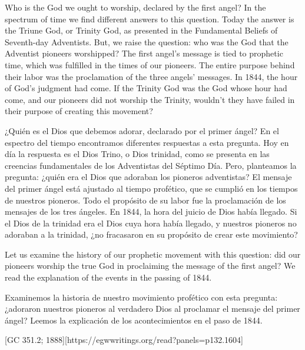 Who is the God we ought to worship, declared by the first angel? In the spectrum of time we find different answers to this question. Today the answer is the Triune God, or Trinity God, as presented in the Fundamental Beliefs of Seventh-day Adventists. But, we raise the question: who was the God that the Adventist pioneers worshipped? The first angel’s message is tied to prophetic time, which was fulfilled in the times of our pioneers. The entire purpose behind their labor was the proclamation of the three angels’ messages. In 1844, the hour of God’s judgment had come. If the Trinity God was the God whose hour had come, and our pioneers did not worship the Trinity, wouldn't they have failed in their purpose of creating this movement?


¿Quién es el Dios que debemos adorar, declarado por el primer ángel? En el espectro del tiempo encontramos diferentes respuestas a esta pregunta. Hoy en día la respuesta es el Dios Trino, o Dios trinidad, como se presenta en las creencias fundamentales de los Adventistas del Séptimo Día. Pero, planteamos la pregunta: ¿quién era el Dios que adoraban los pioneros adventistas? El mensaje del primer ángel está ajustado al tiempo profético, que se cumplió en los tiempos de nuestros pioneros. Todo el propósito de su labor fue la proclamación de los mensajes de los tres ángeles. En 1844, la hora del juicio de Dios había llegado. Si el Dios de la trinidad era el Dios cuya hora había llegado, y nuestros pioneros no adoraban a la trinidad, ¿no fracasaron en su propósito de crear este movimiento?


Let us examine the history of our prophetic movement with this question: did our pioneers worship the true God in proclaiming the message of the first angel? We read the explanation of the events in the passing of 1844.


Examinemos la historia de nuestro movimiento profético con esta pregunta: ¿adoraron nuestros pioneros al verdadero Dios al proclamar el mensaje del primer ángel? Leemos la explicación de los acontecimientos en el paso de 1844.


[GC 351.2; 1888][https://egwwritings.org/read?panels=p132.1604]


